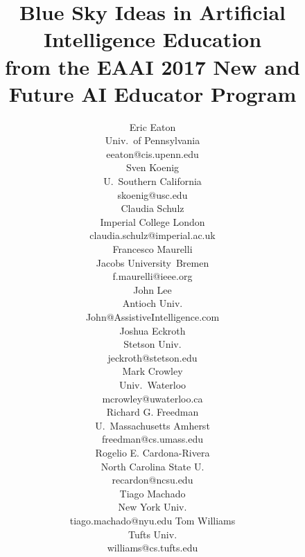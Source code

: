 \documentclass[letterpaper]{article}
\begin{document}
\title{Blue Sky Ideas in Artificial Intelligence Education\\from the EAAI 2017 New and Future AI Educator Program}
\author{
Eric Eaton\\
Univ.~of Pennsylvania\\
eeaton@cis.upenn.edu\\
\And
Sven Koenig\\
U.~Southern California\\
skoenig@usc.edu\\
\And
Claudia Schulz\\
Imperial College London\\
claudia.schulz@imperial.ac.uk\\
\And
Francesco Maurelli\\
Jacobs University~Bremen\\
f.maurelli@ieee.org\\
\AND
John Lee\\
Antioch Univ.\\
John@AssistiveIntelligence.com\\
\And 
Joshua Eckroth\\
Stetson Univ.\\
jeckroth@stetson.edu\\
\And
Mark Crowley\\
Univ.~Waterloo\\
mcrowley@uwaterloo.ca\\
\And
Richard G. Freedman\\
U.~Massachusetts  Amherst\\
freedman@cs.umass.edu\\
\AND
Rogelio E. Cardona-Rivera\\
North Carolina State U.\\
recardon@ncsu.edu\\
\And
Tiago Machado\\
New York Univ.\\
tiago.machado@nyu.edu
\And
Tom Williams\\
Tufts Univ.\\
williams@cs.tufts.edu\\
}
\maketitle
\end{document}
